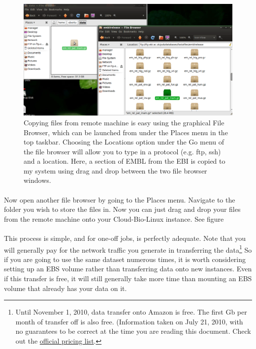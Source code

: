 \begin{figure}[!hd]
	\fbox
	{
		\begin{minipage}{13cm}
\includegraphics[width=\maxwidth]{"images/graphicalFTP_full"}
\caption[Drag and drop from remote machine]{\label{fig:graphicalftp}Copying files from remote machine is easy using the graphical File Browser, which can be launched from under the Places menu in the top taskbar. Choosing the Locations option under the Go menu of the file browser will allow you to type in a protocol (e.g. ftp, ssh) and a location. Here, a section of EMBL from the EBI is copied to my system using drag and drop between the two file browser windows.}
		\end{minipage}
	}
\end{figure}

\paragraph{}Now open another file browser by going to the Places menu. Navigate to the folder you wish to store the files in. Now you can just drag and drop your files from the remote machine onto your Cloud-Bio-Linux instance. See figure




\paragraph{}This process is simple, and for one-off jobs, is perfectly adequate. Note that you will generally pay for the network traffic you generate in transferring the data\footnote{Until November 1, 2010, data transfer onto Amazon is free. The first Gb per month of transfer off is also free. (Information taken on July 21, 2010, with no guarantees to be correct at the time you are reading this document. Check out the \href{http://aws.amazon.com/ec2/}{official pricing list}.} So if you are going to use the same dataset numerous times, it is worth considering setting up an EBS volume rather than transferring data onto new instances. Even if this transfer is free, it will still generally take more time than mounting an EBS volume that already has your data on it.

